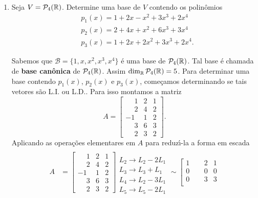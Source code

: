 \begin{exemplo}
\begin{enumerate}[label={\arabic*})]
		\item Seja $V = \mathcal{P}_4(\mathbb{R})$. Determine uma base de $V$ contendo os polin\^omios
		\begin{align*}
			&p_1(x) = 1 + 2x - x^2 + 3x^3 + 2x^4\\
			&p_2(x) = 2 + 4x + x^2 + 6x^3 + 3x^4\\
			&p_3(x) = 1 + 2x + 2x^2 + 3x^3 + 2x^4.
		\end{align*}
		\begin{solucao}
			Sabemos que $\mathcal{B} = \{1,x,x^2,x^3,x^4\}$ \'e uma base de $\mathcal{P}_4(\mathbb{R})$. Tal base \'e chamada de \textbf{base can\^onica} de $\mathcal{P}_4(\mathbb{R})$. Assim $\dim_{\mathbb{R}} \mathcal{P}_4(\mathbb{R}) = 5$. Para determinar uma base contendo $p_1(x)$, $p_2(x)$ e $p_3(x)$, come\c{c}amos determinando se tais vetores s\~ao L.I. ou L.D.. Para isso montamos a matriz
			\[
				A = \begin{bmatrix}
					\phantom{-}1 & 2 & 1\\
					\phantom{-}2 & 4 & 2\\
					-1 & 1 & 2\\
					\phantom{-}3 & 6 & 3\\
					\phantom{-}2 & 3 & 2
				\end{bmatrix}.
			\]
			Aplicando as opera\c{c}\~oes elementares em $A$ para reduz{\'\i}-la a forma em escada
			\begin{align*}
				A &=
					\left[
						\begin{array}{ccc}
		  					\phantom{-}1 & 2 & 1\\
							\phantom{-}2 & 4 & 2\\
							-1 & 1 & 2\\
							\phantom{-}3 & 6 & 3\\
							\phantom{-}2 & 3 & 2
     					\end{array}
     				\right]
     				\begin{array}{l}
     					\phantom{x}\\
     					L_2 \to L_2 - 2L_1\\
     					L_3 \to L_3 + L_1\\
     					L_4 \to L_2 - 3L_1\\
     					L_5 \to L_5 - 2L_1
     				\end{array} \sim
     				\left[
	     				\begin{array}{ccc}
		  					1 & \phantom{-}2 & 1\\
							0 & \phantom{-}0 & 0\\
							0 & \phantom{-}3 & 3\\

\end{array}
\end{align*}
\end{solucao}
\end{enumerate}
\end{exemplo}
